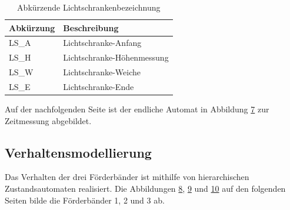 \documentclass[a4paper, 11pt]{article}
\begin{document}
\begin{table}[H]
\centering
    \begin{tabularx}{\textwidth}{|X|X|}
        \hline
        \textbf{Abkürzung}&\textbf{Beschreibung}\\
        \hline
        LS\_A & Lichtschranke-Anfang\\
        \hline
        LS\_H & Lichtschranke-Höhenmessung\\
        \hline
        LS\_W & Lichtschranke-Weiche\\
        \hline
        LS\_E & Lichtschranke-Ende\\
        \hline
    \end{tabularx}
\caption{Abkürzende Lichtschrankenbezeichnung}
\label{lbdesc}
\end{table}

\noindent Auf der nachfolgenden Seite ist der endliche Automat in Abbildung \hyperref[sec:timemeasure]{7} zur Zeitmessung abgebildet.

\label{sec:timemeasure}

\newpage

\subsection{Verhaltensmodellierung}
Das Verhalten der drei Förderbänder ist mithilfe von hierarchischen Zustandsautomaten realisiert. Die Abbildungen \hyperref[sec:hsm1]{8}, \hyperref[sec:hsm2]{9} und \hyperref[sec:hsm3]{10} auf den folgenden Seiten bilde die Förderbänder 1, 2 und 3 ab.

\newpage

\label{sec:hsm1}

\newpage

\label{sec:hsm2}

\newpage
\end{document}
